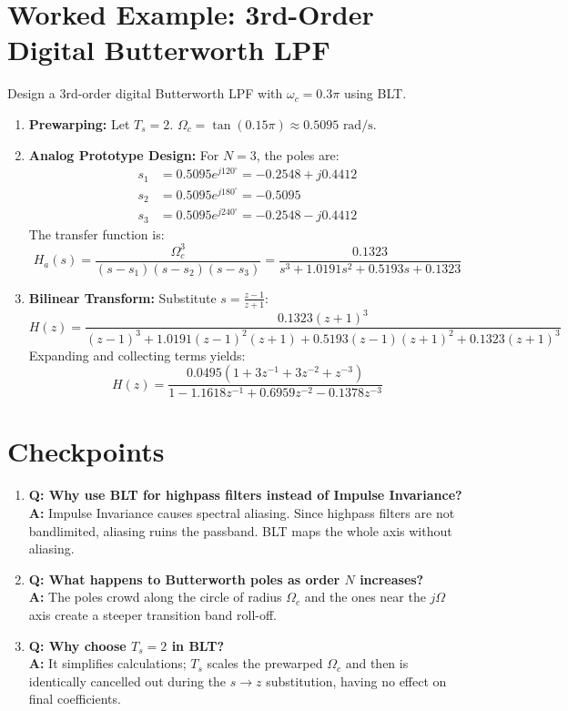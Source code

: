\documentclass[11pt,a4paper]{article}
\begin{document}
\section{Worked Example: 3rd-Order Digital Butterworth LPF}
Design a 3rd-order digital Butterworth LPF with $\omega_c = 0.3\pi$ using BLT.
\begin{enumerate}
    \item \textbf{Prewarping:} Let $T_s = 2$.
    $\Omega_c = \tan(0.15\pi) \approx 0.5095 \text{ rad/s}$.
    
    \item \textbf{Analog Prototype Design:} For $N=3$, the poles are:
    \begin{align*}
    s_1 &= 0.5095 e^{j120^\circ} = -0.2548 + j0.4412 \\
    s_2 &= 0.5095 e^{j180^\circ} = -0.5095 \\
    s_3 &= 0.5095 e^{j240^\circ} = -0.2548 - j0.4412
    \end{align*}
    The transfer function is:
    \begin{equation}
    H_a(s) = \frac{\Omega_c^3}{(s-s_1)(s-s_2)(s-s_3)} = \frac{0.1323}{s^3 + 1.0191s^2 + 0.5193s + 0.1323}
    \end{equation}
    
    \item \textbf{Bilinear Transform:} Substitute $s = \frac{z-1}{z+1}$:
    \begin{equation}
    H(z) = \frac{0.1323 (z+1)^3}{(z-1)^3 + 1.0191(z-1)^2(z+1) + 0.5193(z-1)(z+1)^2 + 0.1323(z+1)^3}
    \end{equation}
    Expanding and collecting terms yields:
    \begin{equation}
    H(z) = \frac{0.0495 (1 + 3z^{-1} + 3z^{-2} + z^{-3})}{1 - 1.1618z^{-1} + 0.6959z^{-2} - 0.1378z^{-3}}
    \end{equation}
\end{enumerate}

\section{Checkpoints}
\begin{enumerate}
    \item \textbf{Q: Why use BLT for highpass filters instead of Impulse Invariance?} \\
    \textbf{A:} Impulse Invariance causes spectral aliasing. Since highpass filters are not bandlimited, aliasing ruins the passband. BLT maps the whole axis without aliasing.
    
    \item \textbf{Q: What happens to Butterworth poles as order $N$ increases?} \\
    \textbf{A:} The poles crowd along the circle of radius $\Omega_c$ and the ones near the $j\Omega$ axis create a steeper transition band roll-off.
    
    \item \textbf{Q: Why choose $T_s = 2$ in BLT?} \\
    \textbf{A:} It simplifies calculations; $T_s$ scales the prewarped $\Omega_c$ and then is identically cancelled out during the $s \to z$ substitution, having no effect on final coefficients.
\end{enumerate}
\end{document}
